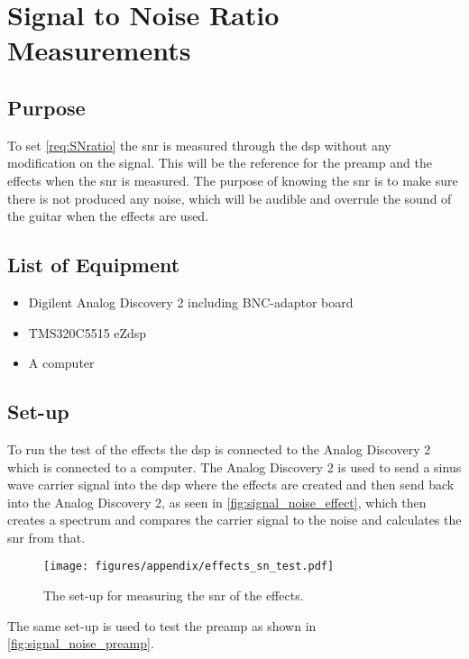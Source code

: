 \chapter{Signal to Noise Ratio Measurements} 
\label{cha:signal_to_noise_ratio_measurements}


\section{Purpose}
To set \autoref{req:SNratio} the \gls{snr} is measured through the \gls{dsp} without any modification on the signal. This will be the reference for the \gls{preamp} and the effects when the \gls{snr} is measured. The purpose of knowing the \gls{snr} is to make sure there is not produced any noise, which will be audible and overrule the sound of the guitar when the effects are used.

\section{List of Equipment}
\begin{itemize}
	\item Digilent Analog Discovery 2 including BNC-adaptor board
	\item TMS320C5515 eZdsp
	\item A computer
\end{itemize}

\section{Set-up}
To run the test of the effects the \gls{dsp} is connected to the Analog Discovery 2 which is connected to a computer. The Analog Discovery 2 is used to send a sinus wave carrier signal into the \gls{dsp} where the effects are created and then send back into the Analog Discovery 2, as seen in \autoref{fig:signal_noise_effect}, which then creates a spectrum and compares the carrier signal to the noise and calculates the \gls{snr} from that.

\begin{figure}[hbpt]
	\centering
	\texttt{[image: figures/appendix/effects\_sn\_test.pdf]}
	\caption{The set-up for measuring the \gls{snr} of the effects.}
	\label{fig:signal_noise_effect}
\end{figure}

The same set-up is used to test the \gls{preamp} as shown in \autoref{fig:signal_noise_preamp}.

